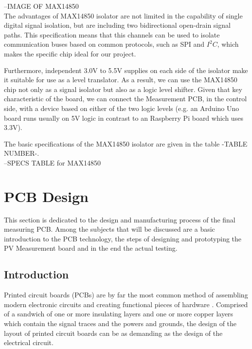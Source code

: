 --IMAGE OF MAX14850\\

The advantages of MAX14850 isolator are not limited in the capability of single digital signal isolation, but are including two bidirectional open-drain signal paths. This specification means that this channels can be used to isolate communication buses based on common protocols, such as SPI and $I^2C$, which makes the specific chip ideal for our project.

Furthermore, independent 3.0V to 5.5V supplies on each side of the isolator make it suitable for use as a level translator. As a result, we can use the MAX14850 chip not only as a signal isolator but also as a logic level shifter. Given that key characteristic of the board, we can connect the Measurement PCB, in the control side, with a device based on either of the two logic levels (e.g. an Arduino Uno board runs usually on 5V logic in contrast to an Raspberry Pi board which uses 3.3V).

The basic specifications of the MAX14850 isolator are given in the table -TABLE NUMBER-.\\

--SPECS TABLE for MAX14850\\

\section{PCB Design}
This section is dedicated to the design and manufacturing process of the final measuring PCB. Among the subjects that will be discussed are a basic introduction to the PCB technology, the steps of designing and prototyping the PV Measurement board and in the end the actual testing.

\subsection{Introduction}
Printed circuit boards (PCBs) are by far the most common method of assembling modern electronic circuits and creating functional pieces of hardware \cite{AD_BasicLinearDesign}. Comprised of a sandwich of one or more insulating layers and one or more copper layers which contain the signal traces and the powers and grounds, the design of the layout of printed circuit boards can be as demanding as the design of the electrical circuit.

